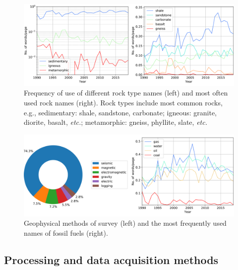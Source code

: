 \documentclass[geosciences,article,submit,moreauthors,pdftex]{Definitions/mdpi}
\begin{document}
\begin{figure}[ht!]
\centering
\includegraphics[width=\textwidth]{rocks.png}
\caption{Frequency of use of different rock type names (left) and most often used rock names (right). Rock types include most common rocks, e.g., sedimentary: shale, sandstone, carbonate; igneous: granite, diorite, basalt, \textit{etc.}; metamorphic: gneiss, phyllite, slate, \textit{etc.}}
\label{rocks}
\end{figure}


\begin{figure}[ht!]
\centering
\includegraphics[width=\textwidth]{methods_pie_objects.png}
\caption{Geophysical methods of survey (left) and the most frequently used names of fossil fuels (right).}
\label{methods_objects}
\end{figure}

\subsection{Processing and data acquisition methods} 
\end{document}
